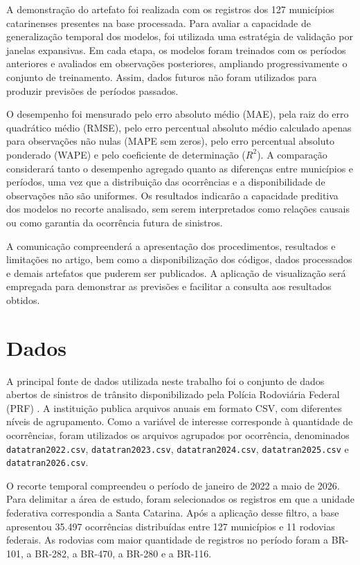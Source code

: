 \documentclass[12pt]{article}
\begin{document}
A demonstração do artefato foi realizada com os registros dos 127 municípios catarinenses presentes na base processada. Para avaliar a capacidade de generalização temporal dos modelos, foi utilizada uma estratégia de validação por janelas expansivas. Em cada etapa, os modelos foram treinados com os períodos anteriores e avaliados em observações posteriores, ampliando progressivamente o conjunto de treinamento. Assim, dados futuros não foram utilizados para produzir previsões de períodos passados.

O desempenho foi mensurado pelo erro absoluto médio (MAE), pela raiz do erro quadrático médio (RMSE), pelo erro percentual absoluto médio calculado apenas para observações não nulas (MAPE sem zeros), pelo erro percentual absoluto ponderado (WAPE) e pelo coeficiente de determinação ($R^2$). A comparação considerará tanto o desempenho agregado quanto as diferenças entre municípios e períodos, uma vez que a distribuição das ocorrências e a disponibilidade de observações não são uniformes. Os resultados indicarão a capacidade preditiva dos modelos no recorte analisado, sem serem interpretados como relações causais ou como garantia da ocorrência futura de sinistros.

A comunicação compreenderá a apresentação dos procedimentos, resultados e limitações no artigo, bem como a disponibilização dos códigos, dados processados e demais artefatos que puderem ser publicados. A aplicação de visualização será empregada para demonstrar as previsões e facilitar a consulta aos resultados obtidos.

\section{Dados}
\label{sec:dados}

A principal fonte de dados utilizada neste trabalho foi o conjunto de dados abertos de sinistros de trânsito disponibilizado pela Polícia Rodoviária Federal (PRF) \cite{prf2026dados}. A instituição publica arquivos anuais em formato CSV, com diferentes níveis de agrupamento. Como a variável de interesse corresponde à quantidade de ocorrências, foram utilizados os arquivos agrupados por ocorrência, denominados \texttt{datatran2022.csv}, \texttt{datatran2023.csv}, \texttt{datatran2024.csv}, \texttt{datatran2025.csv} e \texttt{datatran2026.csv}.

O recorte temporal compreendeu o período de janeiro de 2022 a maio de 2026. Para delimitar a área de estudo, foram selecionados os registros em que a unidade federativa correspondia a Santa Catarina. Após a aplicação desse filtro, a base apresentou 35.497 ocorrências distribuídas entre 127 municípios e 11 rodovias federais. As rodovias com maior quantidade de registros no período foram a BR-101, a BR-282, a BR-470, a BR-280 e a BR-116.
\end{document}
